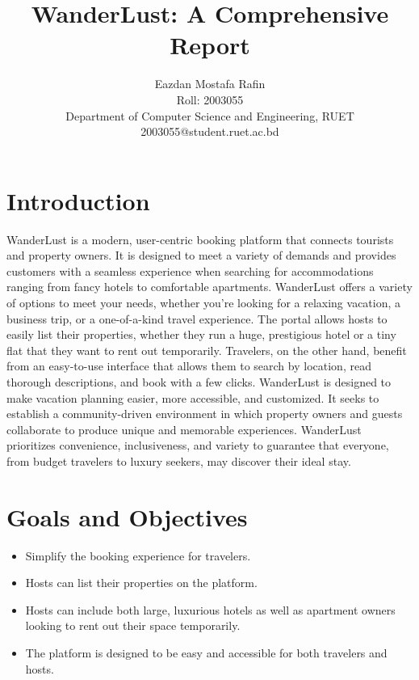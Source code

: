 \documentclass[12pt]{article}
\title{WanderLust: A Comprehensive Report}
\author{Eazdan Mostafa Rafin \\Roll: 2003055 \\ Department of Computer Science and Engineering, RUET \\ 2003055@student.ruet.ac.bd}
\begin{document}
\maketitle


\section{Introduction}
WanderLust is a modern, user-centric booking platform that connects tourists and property owners. It is designed to meet a variety of demands and provides customers with a seamless experience when searching for accommodations ranging from fancy hotels to comfortable apartments. WanderLust offers a variety of options to meet your needs, whether you're looking for a relaxing vacation, a business trip, or a one-of-a-kind travel experience.
The portal allows hosts to easily list their properties, whether they run a huge, prestigious hotel or a tiny flat that they want to rent out temporarily. Travelers, on the other hand, benefit from an easy-to-use interface that allows them to search by location, read thorough descriptions, and book with a few clicks.
WanderLust is designed to make vacation planning easier, more accessible, and customized. It seeks to establish a community-driven environment in which property owners and guests collaborate to produce unique and memorable experiences. WanderLust prioritizes convenience, inclusiveness, and variety to guarantee that everyone, from budget travelers to luxury seekers, may discover their ideal stay.


\section{Goals and Objectives}
\begin{itemize}
    \item Simplify the booking experience for travelers.
    \item Hosts can list their properties on the platform.
    \item Hosts can include both large, luxurious hotels as well as apartment owners looking to rent out their space temporarily.
    \item The platform is designed to be easy and accessible for both travelers and hosts.
\end{itemize}
\end{document}
